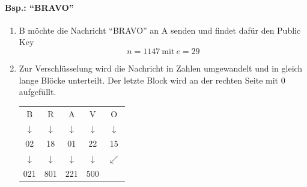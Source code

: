 \documentclass{school}
\begin{document}
\paragraph{Bsp.: ``BRAVO''}
\begin{enumerate}
    \item B möchte die Nachricht ``BRAVO'' an A senden und findet dafür den Public Key $$n = 1147 ~\text{mit}~ e = 29$$
    \item Zur Verschlüsselung wird die Nachricht in Zahlen umgewandelt und in gleich lange Blöcke unterteilt. Der letzte Block wird an der rechten Seite mit 0 aufgefüllt.
    \begin{center}
        \begin{tabular}{c c c c c}
            B & R & A & V & O\\
            $\downarrow$ & $\downarrow$ & $\downarrow$ & $\downarrow$ & $\downarrow $\\
            02 & 18 & 01 & 22 & 15\\
            $\downarrow$ & $\downarrow$ & $\downarrow$ & $\downarrow$ & $\swarrow $\\
            021 & 801 & 221 & 500 &
        \end{tabular}
    \end{center}


\end{enumerate}
\end{document}
